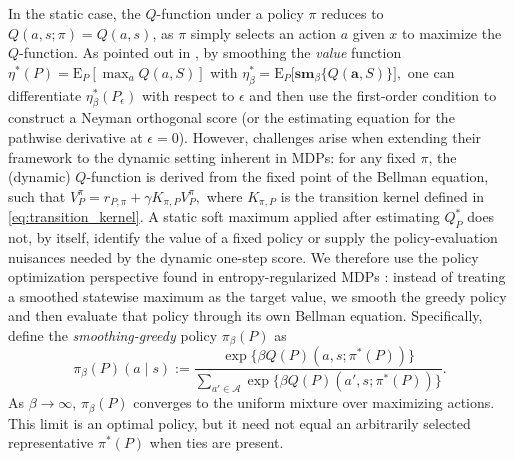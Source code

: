 \documentclass[12pt]{article}
\theoremstyle{remark}\newtheorem{remark}[theorem]{Remark}\theoremstyle{plain}
\newcommand{\E}{\mathrm{E}}
\newcommand{\sm}{\mathbf{sm}}
\newcommand{\va}{\mathbf{a}}
\begin{document}
In the static case, the $Q$-function under a policy $\pi$ reduces to $Q (a, s ;\pi) = Q(a, s)$, as $\pi$ simply selects an action $a$ given $x$ to maximize the $Q$-function.
As pointed out in \cite{whitehouse2025inference}, by smoothing the \textit{value} function $\eta^*(P) = \E_P [\max_{a} Q(a, S)]$ with 
$
    \eta_{\beta}^* = \E_P \big[\sm_{\beta} \big\{ Q(\va, S) \big\} \big],
$
one can differentiate $\eta_{\beta}^*(P_{\epsilon})$ with respect to $\epsilon$ and then use the first-order condition to construct a Neyman orthogonal score (or the estimating equation for the pathwise derivative at $\epsilon = 0$).
However, challenges arise when extending their framework to the dynamic setting inherent in MDPs: for any fixed $\pi$, the (dynamic) $Q$-function is derived from the fixed point of the Bellman equation, such that 
$
    V_P^\pi=r_{P,\pi}+\gamma K_{\pi,P}V_P^\pi,
$
where $K_{\pi,P}$ is the transition kernel defined in
\eqref{eq:transition_kernel}.
A static soft maximum applied after estimating $Q_P^*$ does not, by
itself, identify the value of a fixed policy or supply the
policy-evaluation nuisances needed by the dynamic one-step score.
We therefore use the policy optimization perspective found in
entropy-regularized MDPs \citep{neu2017unified}: instead of treating a
smoothed statewise maximum as the target value, we smooth the greedy
policy and then evaluate that policy through its own Bellman equation.
Specifically, define the \textit{smoothing-greedy} policy
$\pi_{\beta}(P)$ as
\begin{equation}\label{eq:smoothing_greedy_pol}
    \pi_{\beta}(P)(a \mid s) := \frac{\exp\{\beta Q(P)(a, s; \pi^*(P))\}}{\sum_{a' \in \mathcal{A}} \exp\{\beta Q(P)(a', s; \pi^*(P))\}}.
\end{equation}
As $\beta\to\infty$, $\pi_\beta(P)$ converges to the uniform mixture
over maximizing actions.  This limit is an optimal policy, but it need
not equal an arbitrarily selected representative $\pi^*(P)$ when ties
are present.
\end{document}
